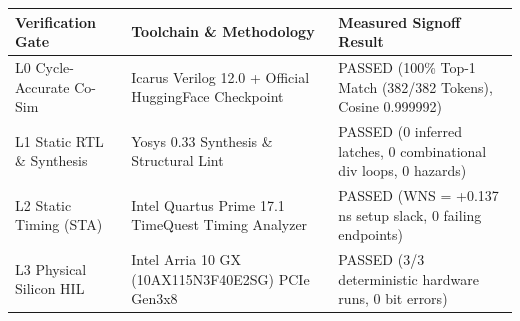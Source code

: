 \documentclass[11pt,a4paper]{article}
\begin{document}
{\footnotesize\renewcommand{\arraystretch}{1.14}\begin{longtable}{@{}L{0.24\textwidth}L{0.34\textwidth}L{0.34\textwidth}@{}}\toprule

\textbf{Verification Gate} & \textbf{Toolchain \& Methodology} & \textbf{Measured Signoff Result}\\\midrule\endhead

L0 Cycle-Accurate Co-Sim & Icarus Verilog 12.0 +\allowbreak{} Official HuggingFace Checkpoint & PASSED (\allowbreak{}100\% Top-1 Match (\allowbreak{}382/\allowbreak{}382 Tokens)\allowbreak{},\allowbreak{} Cosine 0.999992)\allowbreak{}\\[2pt]

L1 Static RTL \& Synthesis & Yosys 0.33 Synthesis \& Structural Lint & PASSED (\allowbreak{}0 inferred latches,\allowbreak{} 0 combinational div loops,\allowbreak{} 0 hazards)\allowbreak{}\\[2pt]

L2 Static Timing (\allowbreak{}STA)\allowbreak{} & Intel Quartus Prime 17.1 TimeQuest Timing Analyzer & PASSED (\allowbreak{}WNS =\allowbreak{} +\allowbreak{}0.137 ns setup slack,\allowbreak{} 0 failing endpoints)\allowbreak{}\\[2pt]

L3 Physical Silicon HIL & Intel Arria 10 GX (\allowbreak{}10AX115N\allowbreak{}3F40E2SG)\allowbreak{} PCIe Gen3x8 & PASSED (\allowbreak{}3/\allowbreak{}3 deterministic hardware runs,\allowbreak{} 0 bit errors)\allowbreak{}\\[2pt]

\bottomrule\end{longtable}}
\end{document}
